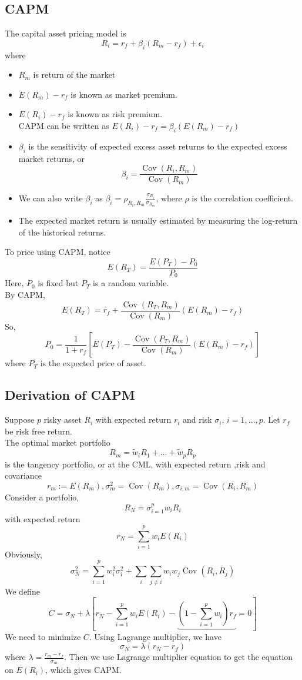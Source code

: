 \documentclass[12pt]{article}
\theoremstyle{definition}
\DeclareMathOperator{\cov}{Cov}
\begin{document}
\subsection{CAPM}
The capital asset pricing model is 
\[
R_i = r_f + \beta_i(R_m - r_f) + \epsilon_i
\]
where 
\begin{itemize}
  \item $R_m$ is return of the market
  \item $E(R_m)-r_f$ is known as market premium.
  \item $E(R_i)-r_f$ is known as risk premium.\\
  CAPM can be written as $E(R_i)-r_f = \beta_i(E(R_m)-r_f)$
  \item $\beta_i$ is the sensitivity of expected excess asset returns to the expected excess market returns, or
  \[
\beta_i = \frac{\cov(R_i, R_m)}{\cov(R_m)}
  \]
  \item We can also write $\beta_i$ as $\beta_i = \rho_{R_i, R_m}\frac{\sigma_{R_i}}{\sigma_{R_m}}$, where $\rho$ is the correlation coefficient.
  \item The expected market return is usually estimated by measuring the log-return of the historical returns.
\end{itemize}
To price using CAPM, notice
\[
E(R_T) = \frac{E(P_T)-P_0}{P_0}
\]
Here, $P_0$ is fixed but $P_T$ is a random variable.\\
By CAPM,
\[
E(R_T) = r_f + \frac{\cov(R_T, R_m)}{\cov(R_m)}(E(R_m)-r_f)
\]
So,
\[
P_0 = \frac{1}{1+r_f}[E(P_T) - \frac{\cov(P_T, R_m)}{\cov(R_m)}(E(R_m)-r_f)]
\]
where $P_T$ is the expected price of asset.
\subsection{Derivation of CAPM}
Suppose $p$ risky asset $R_i$ with expected return $r_i$ and risk $\sigma_i$, $i = 1,\ldots, p$. Let $r_f$ be risk free return.\\
The optimal market portfolio
\[
R_m = \tilde{w}_iR_1 + \ldots + \tilde{w}_pR_p
\]
is the tangency portfolio, or at the CML, with expected return ,risk and covariance
\[
r_m:=E(R_m), \sigma_m^2 = \cov(R_m), \sigma_{i, m}= \cov(R_i, R_m)
\]
Consider a portfolio,
\[
R_N = \sigma_{i=1}^p w_iR_i
\]
with expected return
\[
r_N = \sum_{i=1}^p w_iE(R_i)
\]
Obviously,
\[
\sigma_N^2 = \sum_{i=1}^p w_i^2 \sigma_i^2 + \sum_{i}\sum_{j\neq i} w_i w_j \cov(R_i, R_j)
\]
We define
\[
C = \sigma_N + \lambda[r_N - \sum_{i=1}^p w_iE(R_i)-\underbrace{(1-\sum_{i=1}^p w_i)r_f}{=0}]
\]
We need to minimize $C$. Using Lagrange multiplier, we have
\[
\sigma_N = \lambda(r_N - r_f)
\]
where $\lambda = \frac{r_m-r_f}{\sigma_m}$. Then we use Lagrange multiplier equation to get the equation on $E(R_i)$, which gives CAPM.
\end{document}
